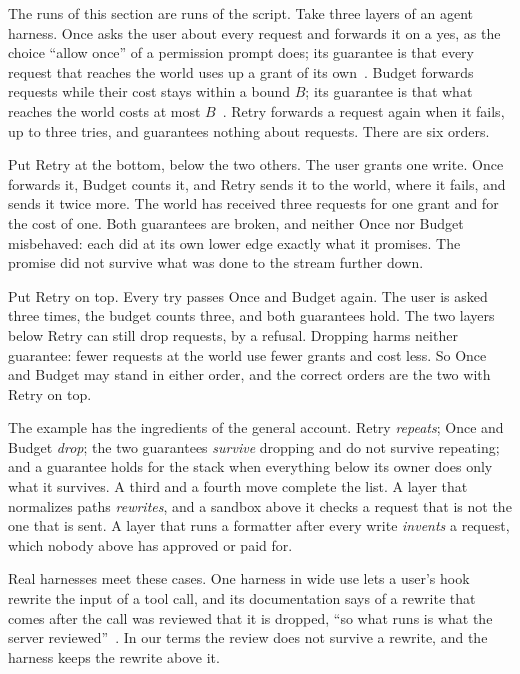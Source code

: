 \documentclass[acmsmall,nonacm,screen]{acmart}
\newcommand{\ly}[1]{\textsf{#1}}
\newcommand{\claim}[2]{#2}
\begin{document}
\claim{overview}{The runs of this section are runs of the script.} Take three layers of an
agent harness. \ly{Once} asks the user about every request and
forwards it on a yes, as the choice ``allow once'' of a permission prompt does; its
guarantee is that every request that reaches the world uses up a grant of its
own~\cite{tpp4}. \ly{Budget} forwards requests while their cost stays within a bound $B$; its
guarantee is that what reaches the world costs at most $B$~\cite{tpp6}. \ly{Retry} forwards a
request again when it fails, up to three tries, and guarantees nothing about requests. There
are six orders.

Put \ly{Retry} at the bottom, below the two others. The user grants one write. \ly{Once}
forwards it, \ly{Budget} counts it, and \ly{Retry} sends it to the world, where it fails, and
sends it twice more. The world has received three requests for one grant and for the cost of
one. Both guarantees are broken, and neither \ly{Once} nor \ly{Budget} misbehaved: each did
at its own lower edge exactly what it promises. The promise did not survive what was done to
the stream further down.

Put \ly{Retry} on top. Every try passes \ly{Once} and \ly{Budget} again. The user is asked
three times, the budget counts three, and both guarantees hold. The two layers below
\ly{Retry} can still drop requests, by a refusal. Dropping harms neither guarantee: fewer
requests at the world use fewer grants and cost less. So \ly{Once} and \ly{Budget} may stand
in either order, and the correct orders are the two with \ly{Retry} on top.

The example has the ingredients of the general account. \ly{Retry} \emph{repeats}; \ly{Once}
and \ly{Budget} \emph{drop}; the two guarantees \emph{survive} dropping and do not survive
repeating; and a guarantee holds for the stack when everything below its owner does only
what it survives. A third and a fourth move complete the list. A layer that normalizes paths
\emph{rewrites}, and a sandbox above it checks a request that is not the one that is sent. A
layer that runs a formatter after every write \emph{invents} a request, which nobody above
has approved or paid for.

Real harnesses meet these cases. One harness in wide use lets a user's hook rewrite the
input of a tool call, and its documentation says of a rewrite that comes after the call was
reviewed that it is dropped, ``so what runs is what the server
reviewed''~\cite{claudecodehooks}. In our terms the review does not survive a rewrite, and
the harness keeps the rewrite above it.
\end{document}
